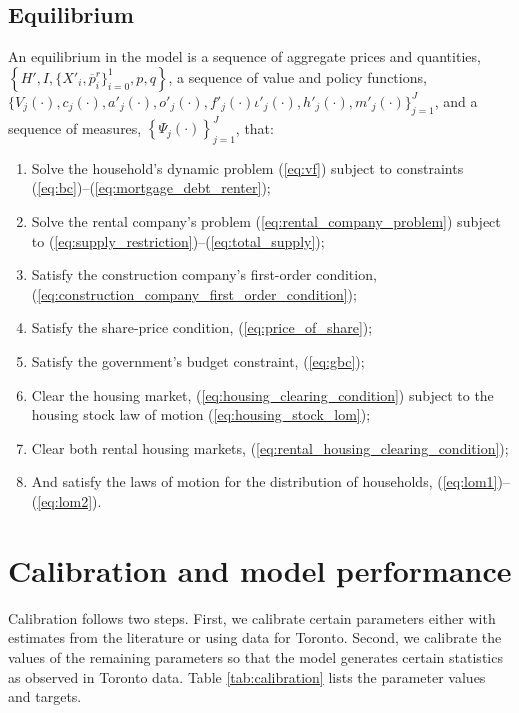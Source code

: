 \documentclass[parskip=full]{article}
\begin{document}
\subsection{Equilibrium}
An equilibrium in the model is a sequence of aggregate prices and quantities, $\left\{H',I,\{X'_{i},\overline{p}^{r}_{i}\}^{1}_{i=0},p,q\right\}$, a sequence of value and policy functions, $\biggl\{V_{j}(\cdot),c_{j}(\cdot),a'_{j}(\cdot),o'_{j}(\cdot),f'_{j}(\cdot)\iota'_{j}(\cdot),h'_{j}(\cdot),m'_{j}(\cdot)\biggl\}_{j=1}^J$, and a sequence of measures, $\left\{\Psi_{j}(\cdot)\right\}_{j=1}^J$, that:
\begin{enumerate}
\item Solve the household's dynamic problem (\ref{eq:vf}) subject to constraints (\ref{eq:bc})--(\ref{eq:mortgage_debt_renter});
\item Solve the rental company's problem (\ref{eq:rental_company_problem}) subject to (\ref{eq:supply_restriction})--(\ref{eq:total_supply});
\item Satisfy the construction company's first-order condition, (\ref{eq:construction_company_first_order_condition});
\item Satisfy the share-price condition, (\ref{eq:price_of_share});
\item Satisfy the government's budget constraint, (\ref{eq:gbc});
\item Clear the housing market,
(\ref{eq:housing_clearing_condition}) subject to the housing stock law of motion (\ref{eq:housing_stock_lom});
\item Clear both rental housing markets,
(\ref{eq:rental_housing_clearing_condition});
\item And satisfy the laws of motion for the distribution of households, (\ref{eq:lom1})--(\ref{eq:lom2}).
\end{enumerate}

\section{Calibration and model performance}\label{sec:calibration}

Calibration follows two steps. First, we calibrate certain parameters either with estimates from the literature or using data for Toronto. Second, we calibrate the values of the remaining parameters so that the model generates certain statistics as observed in Toronto data. Table \ref{tab:calibration} lists the parameter values and targets. 
\end{document}
